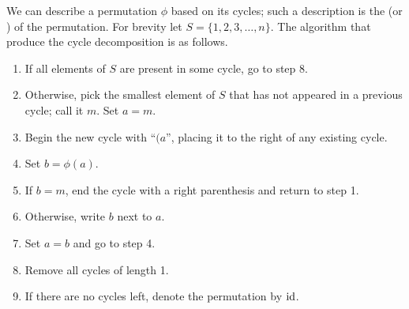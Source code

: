We can describe a permutation $\phi$ based on its cycles; such a description is the  (or ) of the permutation. For brevity let $S = \{1, 2, 3, \dots, n\}$. The algorithm that produce the cycle decomposition is as follows.
\begin{enumerate}
    \item If all elements of $S$ are present in some cycle, go to step 8.
    \item Otherwise, pick the smallest element of $S$ that has not appeared in a previous cycle; call it $m$. Set $a = m$.
    \item Begin the new cycle with ``$(a$'', placing it to the right of any existing cycle.
    \item Set $b = \phi(a)$.
    \item If $b = m$, end the cycle with a right parenthesis and return to step 1.
    \item Otherwise, write $b$ next to $a$.
    \item Set $a = b$ and go to step 4.
    \item Remove all cycles of length 1.
    \item If there are no cycles left, denote the permutation by $\mathrm{id}$.
\end{enumerate}



